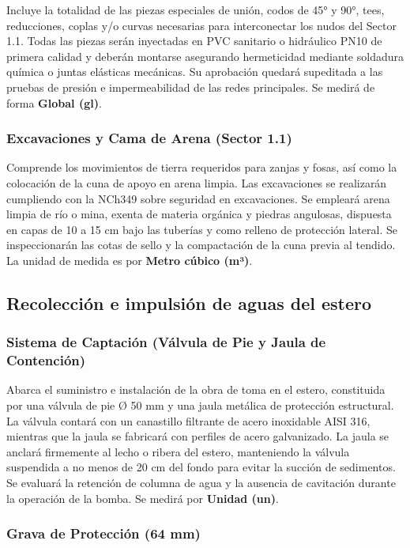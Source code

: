 Incluye la totalidad de las piezas especiales de unión, codos de 45° y 90°, tees, reducciones, coplas y/o curvas necesarias para interconectar los nudos del Sector 1.1. Todas las piezas serán inyectadas en PVC sanitario o hidráulico PN10 de primera calidad y deberán montarse asegurando hermeticidad mediante soldadura química o juntas elásticas mecánicas. Su aprobación quedará supeditada a las pruebas de presión e impermeabilidad de las redes principales. Se medirá de forma \textbf{Global (gl)}.

\subsubsection*{Excavaciones y Cama de Arena (Sector 1.1)}

Comprende los movimientos de tierra requeridos para zanjas y fosas, así como la colocación de la cuna de apoyo en arena limpia. Las excavaciones se realizarán cumpliendo con la NCh349 sobre seguridad en excavaciones. Se empleará arena limpia de río o mina, exenta de materia orgánica y piedras angulosas, dispuesta en capas de 10 a 15 cm bajo las tuberías y como relleno de protección lateral. Se inspeccionarán las cotas de sello y la compactación de la cuna previa al tendido. La unidad de medida es por \textbf{Metro cúbico (m³)}.

\subsection{Recolección e impulsión de aguas del estero}

\subsubsection*{Sistema de Captación (Válvula de Pie y Jaula de Contención)}

Abarca el suministro e instalación de la obra de toma en el estero, constituida por una válvula de pie Ø 50 mm y una jaula metálica de protección estructural. La válvula contará con un canastillo filtrante de acero inoxidable AISI 316, mientras que la jaula se fabricará con perfiles de acero galvanizado. La jaula se anclará firmemente al lecho o ribera del estero, manteniendo la válvula suspendida a no menos de 20 cm del fondo para evitar la succión de sedimentos. Se evaluará la retención de columna de agua y la ausencia de cavitación durante la operación de la bomba. Se medirá por \textbf{Unidad (un)}.

\subsubsection*{Grava de Protección (64 mm)}

